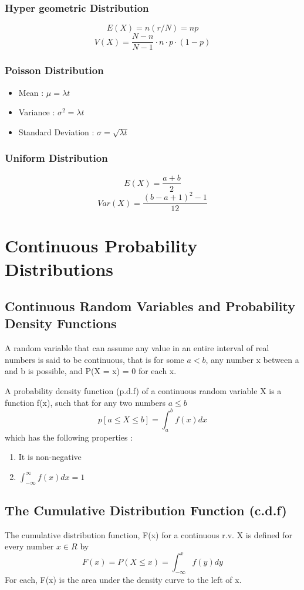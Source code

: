 \documentclass{article}
\begin{document}
\subsubsection{Hyper geometric Distribution}
$$ E(X) = n (r/N) = np $$
$$ V(X) = \frac{N-n}{N-1}\cdot n \cdot p \cdot (1 -p) $$

\subsubsection{Poisson Distribution}
\begin{itemize}
\item Mean : \(\mu = \lambda t\)
\item Variance : \(\sigma^2 = \lambda t\)
\item Standard Deviation : \(\sigma = \sqrt{\lambda t}\)
\end{itemize}

\subsubsection{Uniform Distribution}
$$ E(X) = \frac{a+b}{2}$$
$$Var(X) = \frac{(b-a+1)^2 -1}{12}$$

\section{Continuous Probability Distributions}

\subsection{Continuous Random Variables and Probability Density Functions}

A random variable that can assume any value in an entire interval of real numbers is said to be continuous, that is for some \(a <b\), any number x between a and b is possible, and P(X = x) = 0 for each x.\

A probability density function (p.d.f) of a continuous random variable X is a function f(x), such that for any two numbers \(a \leq b\)
$$ p[a \leq X \leq b] = \int_{a}^{b} f(x) dx $$ 
which has the following properties : 
\begin{enumerate}
\item It is non-negative 
\item \(\int_{-\infty}^{\infty} f(x) dx = 1 \)
\end{enumerate}

\subsection{The Cumulative Distribution Function (c.d.f)}
The cumulative distribution function, F(x) for a continuous r.v. X is defined for every number \(x \in R\) by 
$$ F(x) = P(X \leq x) = \int_{-\infty}^{x} f(y) dy $$
For each, F(x) is the area under the density curve to the left of x.
\end{document}
